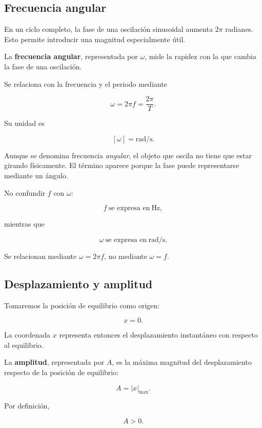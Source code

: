 \subsection{Frecuencia angular}

En un ciclo completo, la fase de una oscilación sinusoidal aumenta \(2\pi\) radianes. Esto permite introducir una magnitud especialmente útil.

\begin{definicion}
La \textbf{frecuencia angular}, representada por \(\omega\), mide la rapidez con la que cambia la fase de una oscilación.

Se relaciona con la frecuencia y el periodo mediante

\[ \boxed{\omega=2\pi f=\frac{2\pi}{T}}. \]

Su unidad es

\[ [\omega]=\si{\radian\per\second}. \]
\end{definicion}

Aunque se denomina frecuencia \emph{angular}, el objeto que oscila no tiene que estar girando físicamente. El término aparece porque la fase puede representarse mediante un ángulo.

\begin{advertencia}
No confundir \(f\) con \(\omega\):

\[ f\ \text{se expresa en}\ \si{\hertz}, \]

mientras que

\[ \omega\ \text{se expresa en}\ \si{\radian\per\second}. \]

Se relacionan mediante \(\omega=2\pi f\), no mediante \(\omega=f\).
\end{advertencia}

\subsection{Desplazamiento y amplitud}

Tomaremos la posición de equilibrio como origen:

\[ x=0. \]

La coordenada \(x\) representa entonces el desplazamiento instantáneo con respecto al equilibrio.

\begin{definicion}[Amplitud]
La \textbf{amplitud}, representada por \(A\), es la máxima magnitud del desplazamiento respecto de la posición de equilibrio:

\[ \boxed{A=|x|_{\max}}. \]

Por definición,

\[ A>0. \]
\end{definicion}

